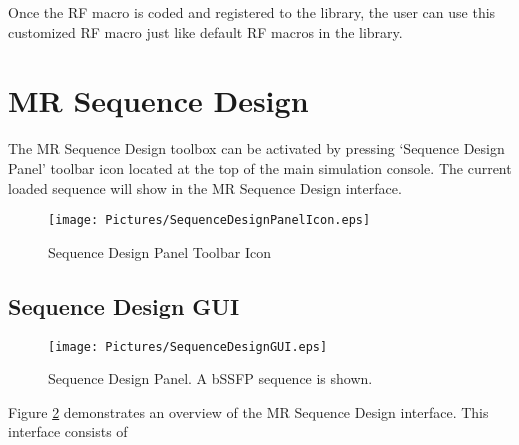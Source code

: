 \documentclass{book}%
\begin{document}
Once the RF macro is coded and registered to the library, the user can use this customized RF macro just like default RF macros in the library.

\section{MR Sequence Design}

The MR Sequence Design toolbox can be activated by pressing `Sequence Design Panel' toolbar icon located at the top of the main simulation console. The current loaded sequence will show in the MR Sequence Design interface.

\begin{figure}[htbp]
	\centering
		\texttt{[image: Pictures/SequenceDesignPanelIcon.eps]}
	\caption{Sequence Design Panel Toolbar Icon}
	\label{fig:SequenceDesignPanelIcon}
\end{figure}

\subsection{Sequence Design GUI}

\begin{figure}[htbp]
	\centering
		\texttt{[image: Pictures/SequenceDesignGUI.eps]}
	\caption{Sequence Design Panel. A bSSFP sequence is shown.}
	\label{fig:SequenceDesignGUI}
\end{figure}

Figure \ref{fig:SequenceDesignGUI} demonstrates an overview of the MR Sequence Design interface. This interface consists of 
\end{document}
